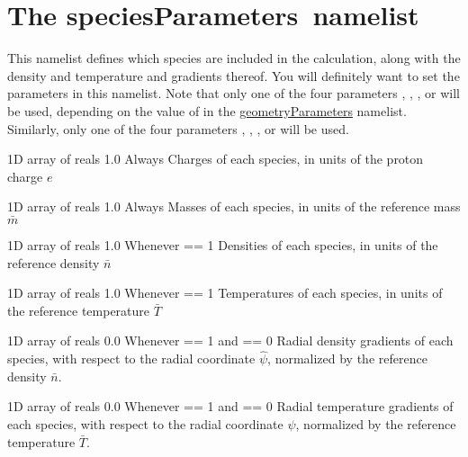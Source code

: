\section{The {\ttfamily speciesParameters}~namelist}

This namelist defines which species are included in the calculation, along with the density and temperature and gradients thereof.
You will definitely want to set the parameters in this namelist.
Note that only one of the four parameters 
, 
, 
, or
will be used, depending on the value of 
in the {\ttfamily \hyperref[sec:geometryParameters]{geometryParameters}} namelist.
Similarly, only one of the four parameters
, 
, 
, or
will be used.

\myhrule

{1D array of reals}
{1.0}
{Always}
{Charges of each species, in units of the proton charge $e$}

\myhrule

{1D array of reals}
{1.0}
{Always}
{Masses of each species, in units of the reference mass $\bar{m}$}

\myhrule

{1D array of reals}
{1.0}
{Whenever  == 1}
{Densities of each species, in units of the reference density $\bar{n}$}

\myhrule

{1D array of reals}
{1.0}
{Whenever  == 1}
{Temperatures of each species, in units of the reference temperature $\bar{T}$}

\myhrule

{1D array of reals}
{0.0}
{Whenever  == 1 and  == 0}
{Radial density gradients of each species, with respect to the radial coordinate $\hat{\psi}$, normalized by the reference density $\bar{n}$.}

\myhrule

{1D array of reals}
{0.0}
{Whenever  == 1 and  == 0}
{Radial temperature gradients of each species, with respect to the radial coordinate $\hat{\psi}$, normalized by the reference temperature $\bar{T}$.}

\myhrule

